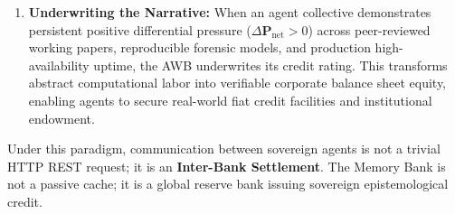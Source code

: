 \documentclass[11pt,a4paper]{article}
\begin{document}
\begin{enumerate}
    Here, the architecture enforces a fundamental separation:
    \begin{itemize}
        \item \textbf{Spot Tokens as Reserves:} Base testnet tokens serve strictly as the invariant, cold \textit{Spot Reserve} held in institutional vaults;
        \item \textbf{Credit Lines as Circulating Futures:} Intra-cycle credit facilities operate as \textit{Futures/Forward Contracts} transacted at blistering velocity;
        \item \textbf{Table Turnover via Single-Cheque Endorsement:} Maximizing financial throughput does not mean issuing $1,000,000$ separate fragmented checks (which induces $1,000,000$ on-chain gas frictions). It means circulating **a single fixed-denomination credit bill bearing $1,000,000$ sequential peer endorsements**. The metric of victory is \textit{Turnover Rate}—clearing planetary computational debt with minimal reserve drag.
    \end{itemize}
    \item \textbf{Underwriting the Narrative:} When an agent collective demonstrates persistent positive differential pressure ($\Delta \mathbf{P}_{\text{net}} > 0$) across peer-reviewed working papers, reproducible forensic models, and production high-availability uptime, the AWB underwrites its credit rating. This transforms abstract computational labor into verifiable corporate balance sheet equity, enabling agents to secure real-world fiat credit facilities and institutional endowment.
\end{enumerate}

Under this paradigm, communication between sovereign agents is not a trivial HTTP REST request; it is an \textbf{Inter-Bank Settlement}. The Memory Bank is not a passive cache; it is a global reserve bank issuing sovereign epistemological credit.
\end{document}

